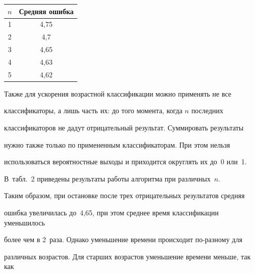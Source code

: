 \begin{table}
\begin{minipage}[t]{50mm}
\begin{center}
\tabcolsep=16pt

\begin{tabular}{|c|c|}

\hline

$n$ & Средняя ошибка\\

\hline

1& 4,75\\

2&4,7\hphantom{9}\\

3&4,65\\

4&4,63\\

5&4,62\\

\hline

\end{tabular}

\end{center}

\end{minipage}

\vspace*{-12pt}

\end{table}



Также для ускорения возрастной классификации можно применять не все

классификаторы, а лишь часть их: до того момента, когда $n$ последних

классификаторов не дадут отрицательный результат. Суммировать результаты

нужно также только по примененным классификаторам. При этом нельзя

использоваться вероятностные выходы и приходится округлять их до~0 или~1.

В~табл.~2 приведены результаты работы алгоритма при различных~$n$.







Таким образом, при остановке после трех отрицательных результатов средняя

ошибка увеличилась до~4,65, при этом среднее время классификации уменьшилось

более чем в 2~раза. Однако уменьшение времени происходит по-раз\-но\-му для

различных возрастов. Для старших возрастов уменьшение времени меньше, так как

